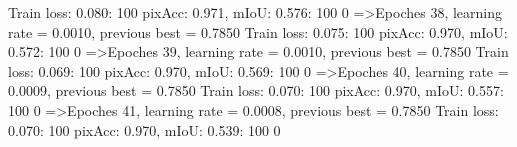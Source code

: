 Train loss: 0.080: 100%
pixAcc: 0.971, mIoU: 0.576: 100%
  0%
=>Epoches 38, learning rate = 0.0010,                 previous best = 0.7850
Train loss: 0.075: 100%
pixAcc: 0.970, mIoU: 0.572: 100%
  0%
=>Epoches 39, learning rate = 0.0010,                 previous best = 0.7850
Train loss: 0.069: 100%
pixAcc: 0.970, mIoU: 0.569: 100%
  0%
=>Epoches 40, learning rate = 0.0009,                 previous best = 0.7850
Train loss: 0.070: 100%
pixAcc: 0.970, mIoU: 0.557: 100%
  0%
=>Epoches 41, learning rate = 0.0008,                 previous best = 0.7850
Train loss: 0.070: 100%
pixAcc: 0.970, mIoU: 0.539: 100%
  0%
